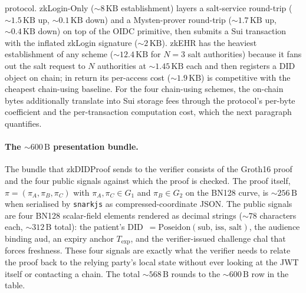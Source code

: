 protocol. \textsf{zkLogin-Only} ($\sim\!8\,\mathrm{KB}$ establishment)
layers a salt-service round-trip ($\sim\!1.5\,\mathrm{KB}$ up,
$\sim\!0.1\,\mathrm{KB}$ down) and a Mysten-prover round-trip
($\sim\!1.7\,\mathrm{KB}$ up, $\sim\!0.4\,\mathrm{KB}$ down) on top of
the OIDC primitive, then submits a Sui transaction with the inflated
zkLogin signature ($\sim\!2\,\mathrm{KB}$). \textsf{zkEHR} has the
heaviest establishment of any scheme ($\sim\!12.4\,\mathrm{KB}$ for
$N=3$ salt authorities) because it fans out the salt request to $N$
authorities at $\sim\!1.45\,\mathrm{KB}$ each and then registers a DID
object on chain; in return its per-access cost ($\sim\!1.9\,\mathrm{KB}$)
is competitive with the cheapest chain-using baseline.
For the four chain-using schemes, the on-chain bytes additionally
translate into Sui storage fees through the protocol's per-byte
coefficient and the per-transaction computation cost, which the next
paragraph quantifies.

\paragraph{The $\sim\!600\,\mathrm{B}$ presentation bundle.}
The bundle that \textsf{zkDIDProof} sends to the verifier consists of
the Groth16 proof and the four public signals against which the proof
is checked. The proof itself,
$\pi=(\pi_A,\pi_B,\pi_C)$ with $\pi_A,\pi_C\in G_1$ and $\pi_B\in G_2$
on the BN128 curve, is $\sim\!256\,\mathrm{B}$ when serialised by
\texttt{snarkjs} as compressed-coordinate JSON. The public signals are
four BN128 scalar-field elements rendered as decimal strings
($\sim\!78$ characters each, $\sim\!312\,\mathrm{B}$ total): the
patient's
\textsf{DID}~$=\mathrm{Poseidon}(\mathrm{sub},\,\mathrm{iss},\,
\mathrm{salt})$, the audience binding \textsf{aud}, an expiry anchor
$T_{\mathrm{exp}}$, and the verifier-issued challenge \textsf{chal} that
forces freshness. These four signals are exactly what the verifier
needs to relate the proof back to the relying party's local state
without ever looking at the JWT itself or contacting a chain. The total
$\sim\!568\,\mathrm{B}$ rounds to the $\sim\!600\,\mathrm{B}$ row in the
table.


